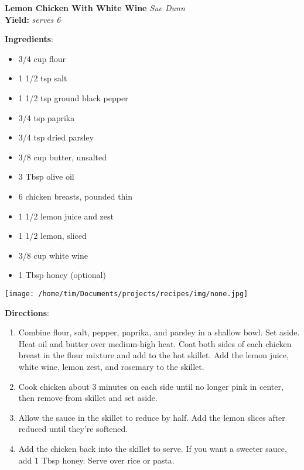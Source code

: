 \documentclass[11pt, twoside, openany]{book}
\begin{document}
\noindent\begin{minipage}[t]{\linewidth}%
{\Large\textbf{Lemon Chicken With White Wine}} \label{lemon-chicken-with-white-wine}\hfill\textit{Sue Dunn}\\
\textbf{Yield:} \textit{serves 6}\\
\noindent\begin{minipage}[t]{0.78\linewidth}%
\textbf{Ingredients}:\vspace{-3mm}
\begin{multicols}{2}
\begin{itemize}\setlength\itemsep{-1mm}
\item 3/4 cup flour
\item 1 1/2 tsp salt
\item 1 1/2 tsp ground black pepper
\item 3/4 tsp paprika
\item 3/4 tsp dried parsley
\item 3/8 cup butter, unsalted
\item 3 Tbsp olive oil
\item 6 chicken breasts, pounded thin
\item 1 1/2 lemon juice and zest
\item 1 1/2 lemon, sliced
\item 3/8 cup white wine
\item 1 Tbsp honey (optional)
\end{itemize}
\end{multicols}
\end{minipage}
\noindent\begin{minipage}[t]{0.18\linewidth}
\centering \strut\vspace*{-\baselineskip}\newline
\texttt{[image: /home/tim/Documents/projects/recipes/img/none.jpg]}\\
\end{minipage}\vspace{3mm}
\textbf{Directions}:
\vspace{-3mm}\begin{enumerate}\setlength\itemsep{-1mm}
\item Combine flour, salt, pepper, paprika, and parsley in a shallow bowl. Set aside. Heat oil and butter over medium-high heat. Coat both sides of each chicken breast in the flour mixture and add to the hot skillet. Add the lemon juice, white wine, lemon zest, and rosemary to the skillet.
\item Cook chicken about 3 minutes on each side until no longer pink in center, then remove from skillet and set aside.
\item Allow the sauce in the skillet to reduce by half. Add the lemon slices after reduced until they're softened.
\item Add the chicken back into the skillet to serve. If you want a sweeter sauce, add 1 Tbsp honey. Serve over rice or pasta.
\end{enumerate}
\end{minipage}\vspace{8mm}
\end{document}
